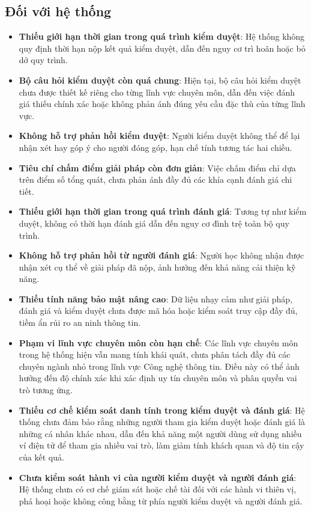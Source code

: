 \subsection{Đối với hệ thống}
\begin{itemize}
  \item \textbf{Thiếu giới hạn thời gian trong quá trình kiểm duyệt}: Hệ thống không quy định thời hạn nộp kết quả kiểm duyệt, dẫn đến nguy cơ trì hoãn hoặc bỏ dở quy trình.
  \item \textbf{Bộ câu hỏi kiểm duyệt còn quá chung}: Hiện tại, bộ câu hỏi kiểm duyệt chưa được thiết kế riêng cho từng lĩnh vực chuyên môn, dẫn đến việc đánh giá thiếu chính xác hoặc không phản ánh đúng yêu cầu đặc thù của từng lĩnh vực.
  \item \textbf{Không hỗ trợ phản hồi kiểm duyệt}: Người kiểm duyệt không thể để lại nhận xét hay góp ý cho người đóng góp, hạn chế tính tương tác hai chiều.
  \item \textbf{Tiêu chí chấm điểm giải pháp còn đơn giản}: Việc chấm điểm chỉ dựa trên điểm số tổng quát, chưa phản ánh đầy đủ các khía cạnh đánh giá chi tiết.
  \item \textbf{Thiếu giới hạn thời gian trong quá trình đánh giá}: Tương tự như kiểm duyệt, không có thời hạn đánh giá dẫn đến nguy cơ đình trệ toàn bộ quy trình.
  \item \textbf{Không hỗ trợ phản hồi từ người đánh giá}: Người học không nhận được nhận xét cụ thể về giải pháp đã nộp, ảnh hưởng đến khả năng cải thiện kỹ năng.
  \item \textbf{Thiếu tính năng bảo mật nâng cao}: Dữ liệu nhạy cảm như giải pháp, đánh giá và kiểm duyệt chưa được mã hóa hoặc kiểm soát truy cập đầy đủ, tiềm ẩn rủi ro an ninh thông tin.
  \item \textbf{Phạm vi lĩnh vực chuyên môn còn hạn chế}: Các lĩnh vực chuyên môn trong hệ thống hiện vẫn mang tính khái quát, chưa phân tách đầy đủ các chuyên ngành nhỏ trong lĩnh vực Công nghệ thông tin.
        Điều này có thể ảnh hưởng đến độ chính xác khi xác định uy tín chuyên môn và phân quyền vai trò tương ứng.
  \item \textbf{Thiếu cơ chế kiểm soát danh tính trong kiểm duyệt và đánh giá}: Hệ thống chưa đảm bảo rằng những người tham gia kiểm duyệt hoặc đánh giá là những cá nhân khác nhau, dẫn đến khả năng một người dùng sử dụng nhiều ví điện tử để tham gia nhiều vai trò, làm giảm tính khách quan và độ tin cậy của kết quả.
  \item \textbf{Chưa kiểm soát hành vi của người kiểm duyệt và người đánh giá}: Hệ thống chưa có cơ chế giám sát hoặc chế tài đối với các hành vi thiên vị, phá hoại hoặc không công bằng từ phía người kiểm duyệt và người đánh giá.
\end{itemize}

